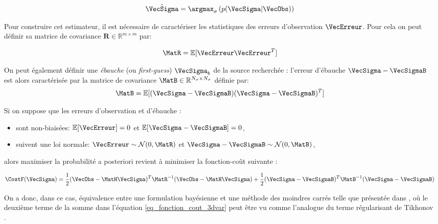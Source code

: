  \begin{equation}
	 \label{eq_maximum_posterior}
	 \hat{\VecSigma} = \argmax_\sigma \left(p(\VecSigma | \VecObs)\right)
 \end{equation}
 
 Pour construire cet estimateur, il est nécessaire de caractériser les statistiques des erreurs d'observation $\VecErreur$. Pour cela on peut définir sa matrice de covariance $\bm{R} \in \mathbb{R}^{m\times m}$ par: 
 
 \begin{equation}
	 \label{eq_matrice_R}
	 \MatR = \mathbb{E}[\VecErreur \VecErreur^T]
 \end{equation}
 
 On peut également définir une \textit{ébauche} (ou \textit{first-guess}) $\VecSigma_b$ de la source recherchée : l'erreur d'ébauche $\VecSigma - \VecSigmaB$ est alors caractérisée par la matrice de covariance $\MatB \in \mathbb{R}^{N_\sigma \times N_\sigma}$ définie par:\\
 
 
 \begin{equation}
	 \label{eq_matrice_B}
	 \MatB = \mathbb{E}[(\VecSigma - \VecSigmaB)(\VecSigma - \VecSigmaB)^T]
 \end{equation}
 
 Si on suppose que les erreurs d'observation et d'ébauche : \\
 
 \begin{itemize}
 	\item sont non-biaisées: $\mathbb{E}[\VecErreur] = 0$ et $\mathbb{E}[\VecSigma - \VecSigmaB] = 0$,
 	\item suivent une loi normale: $\VecErreur \sim  \mathcal{N}(0,\MatR)$ et $\VecSigma - \VecSigmaB \sim \mathcal{N}(0,\MatB)$,\\
 \end{itemize}
 
 alors maximiser la probabilité a posteriori revient à minimiser la fonction-coût suivante \cite{Winiarek2011}:
 
 \begin{equation}
	 \label{eq_fonction_cout_3dvar}
	 \CostF(\VecSigma) = \dfrac{1}{2}(\VecObs - \MatH\VecSigma)^T \MatR^{-1} (\VecObs - \MatH\VecSigma) + \dfrac{1}{2}(\VecSigma - \VecSigmaB)^T \MatB^{-1}(\VecSigma - \VecSigmaB)
 \end{equation}
 
 On a donc, dans ce cas, équivalence entre une formulation bayésienne et une méthode des moindres carrés telle que présentée dans \cite{Davoine2007}, où le deuxième terme de la somme dans l'équation \eqref{eq_fonction_cout_3dvar} peut être vu comme l'analogue du terme régularisant de Tikhonov \cite{Tikhonov1963}.\\
 
